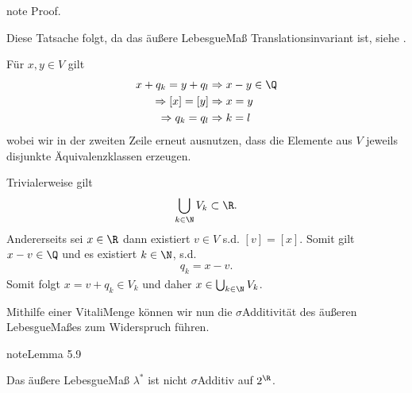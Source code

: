 \documentclass[letterpaper,10pt,german]{jupyterBook}
\begin{document}
\begin{sphinxadmonition}{note}
\sphinxAtStartPar
Proof. 

\sphinxAtStartPar
{}

\sphinxAtStartPar
Diese Tatsache folgt, da das äußere Lebesgue\sphinxhyphen{}Maß Translationsinvariant ist, siehe {\hyperref[\detokenize{masstheorie/masstheorie:rem:transinvariance}]{}}.

\sphinxAtStartPar
{}

\sphinxAtStartPar
Für \(x,y\in V\) gilt
\begin{equation*}
\begin{split}x + q_k = y + q_l&\Rightarrow x-y\in\Q\\
\Rightarrow [x]=[y]&\Rightarrow x=y\\
\Rightarrow q_k=q_l&\Rightarrow k=l\end{split}
\end{equation*}
\sphinxAtStartPar
wobei wir in der zweiten Zeile erneut ausnutzen, dass die Elemente aus \(V\) jeweils disjunkte Äquivalenzklassen erzeugen.

\sphinxAtStartPar
{}

\sphinxAtStartPar
Trivialerweise gilt
\begin{equation*}
\begin{split}\bigcup_{k\in\N} V_k \subset \R.\end{split}
\end{equation*}
\sphinxAtStartPar
Andererseits sei \(x\in\R\) dann existiert \(v\in V\) s.d. \([v] = [x]\). Somit gilt \(x-v\in\Q\) und es existiert \(k\in\N\), s.d.
\begin{equation*}
\begin{split}q_k = x-v.\end{split}
\end{equation*}
\sphinxAtStartPar
Somit folgt \(x=v+q_k\in V_k\) und daher \(x\in\bigcup_{k\in\N} V_k\).
\end{sphinxadmonition}

\sphinxAtStartPar
Mithilfe einer Vitali\sphinxhyphen{}Menge können wir nun die \(\sigma\)\sphinxhyphen{}Additivität des äußeren Lebesgue\sphinxhyphen{}Maßes zum Widerspruch führen.
\label{masstheorie/masstheorie:lemma-35}
\begin{sphinxadmonition}{note}{Lemma 5.9}



\sphinxAtStartPar
Das äußere Lebesgue\sphinxhyphen{}Maß \(\lambda^\ast\) ist nicht \(\sigma\)\sphinxhyphen{}Additiv auf \(2^{\R}\).
\end{sphinxadmonition}
\end{document}
